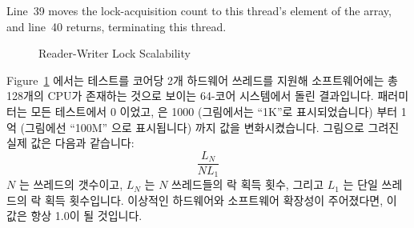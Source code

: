 Line~39 moves the lock-acquisition count to this thread's element of the
 array, and line~40 returns, terminating this thread.
\fi

\begin{figure}[tb]
\centering
{}
\caption{Reader-Writer Lock Scalability}
\label{fig:toolsoftrade:Reader-Writer Lock Scalability}
\end{figure}

Figure~\ref{fig:toolsoftrade:Reader-Writer Lock Scalability} 에서는 테스트를
코어당 2개 하드웨어 쓰레드를 지원해 소프트웨어에는 총 128개의 CPU가 존재하는
것으로 보이는 64-코어  시스템에서 돌린 결과입니다.
 패러미터는 모든 테스트에서 0 이었고,  은 1000
(그림에서는 ``1K''로 표시되었습니다) 부터 1억 (그림에선 ``100M'' 으로
표시됩니다) 까지 값을 변화시켰습니다.
그림으로 그려진 실제 값은 다음과 같습니다:
\begin{equation}
	\frac{L_N}{N L_1}
\end{equation}
$N$ 는 쓰레드의 갯수이고, $L_N$ 는 $N$ 쓰레드들의 락 획득 횟수, 그리고 $L_1$ 는
단일 쓰레드의 락 획득 횟수입니다.
이상적인 하드웨어와 소프트웨어 확장성이 주어졌다면, 이 값은 항상 1.0이 될
것입니다.

